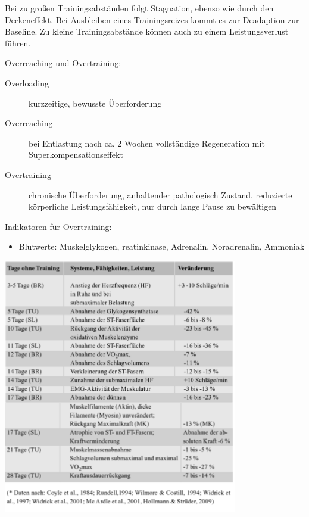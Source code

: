 \begin{minipage}{0.5\textwidth}
Bei zu großen Trainingsabständen folgt Stagnation, ebenso wie durch den Deckeneffekt. Bei Ausbleiben eines Trainingsreizes kommt es zur Deadaption zur Baseline. Zu kleine Trainingsabstände können auch zu einem Leistungsverlust führen.

Overreaching und Overtraining:
\begin{description}
    \item [Overloading] kurzzeitige, bewusste Überforderung
    \item [Overreaching] bei Entlastung nach ca. 2 Wochen vollständige Regeneration mit Superkompensationseffekt
    \item [Overtraining] chronische Überforderung,  anhaltender pathologisch Zustand, reduzierte körperliche Leistungsfähigkeit, nur durch lange Pause zu bewältigen
\end{description}

Indikatoren für Overtraining:
\begin{itemize}
    \item Blutwerte: Muskelglykogen, reatinkinase, Adrenalin, Noradrenalin, Ammoniak
\end{itemize}
\end{minipage}
\begin{minipage}{0.5\textwidth}
\includegraphics[width=\textwidth]{pictures/leistungsverlust_umfang}
\end{minipage}

